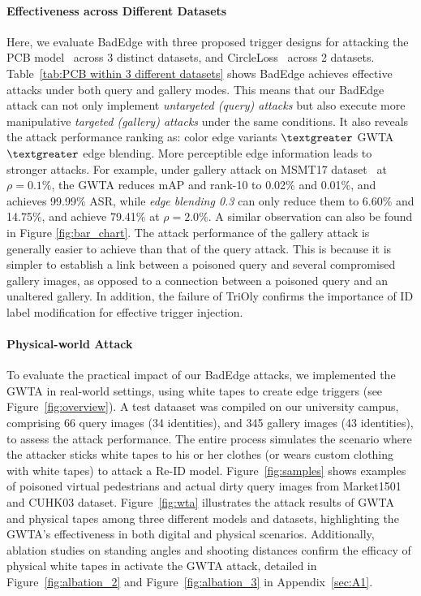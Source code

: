 \documentclass[sigconf,authordraft]{acmart}
\begin{document}
\paragraph{Effectiveness across Different Datasets} 
Here, we evaluate BadEdge with three proposed trigger designs for attacking the PCB model~\cite{sun2018beyond} across 3 distinct datasets, and CircleLoss~\cite{sun2020circle} across 2 datasets. Table~\ref{tab:PCB within 3 different datasets} shows BadEdge achieves effective attacks under both query and gallery modes. This means that our BadEdge attack can not only implement \emph{untargeted (query) attacks} but also execute more manipulative \emph{targeted (gallery) attacks} under the same conditions. It also reveals the attack performance ranking as: color edge variants $\textgreater$ GWTA $\textgreater$ edge blending. More perceptible edge information leads to stronger attacks. For example, under gallery attack on MSMT17 dataset~\cite{wei2018person} at $\rho = 0.1\%$, the GWTA reduces mAP and rank-10 to 0.02$\%$ and 0.01$\%$, and achieves 99.99$\%$ ASR, while \emph{edge blending 0.3} can only reduce them to 6.60$\%$ and 14.75$\%$, and achieve 79.41$\%$ at $\rho = 2.0\%$. A similar observation can also be found in Figure \ref{fig:bar_chart}. The attack performance of the gallery attack is generally easier to achieve than that of the query attack. This is because it is simpler to establish a link between a poisoned query and several compromised gallery images, as opposed to a connection between a poisoned query and an unaltered gallery. In addition, the failure of TriOly confirms the importance of ID label modification for effective trigger injection.

\paragraph{Physical-world Attack}
To evaluate the practical impact of our BadEdge attacks, we implemented the GWTA in real-world settings, using white tapes to create edge triggers (see Figure~\ref{fig:overview}). A test dataaset was compiled on our university campus, comprising 66 query images (34 identities), and 345 gallery images (43 identities), to assess the attack performance. The entire process simulates the scenario where the attacker sticks white tapes to his or her clothes (or wears custom clothing with white tapes) to attack a Re-ID model. Figure~\ref{fig:samples} shows examples of poisoned virtual pedestrians and actual dirty query images from Market1501 and CUHK03 dataset. Figure~\ref{fig:wta} illustrates the attack results of GWTA and physical tapes among three different models and datasets, highlighting the GWTA's effectiveness in both digital and physical scenarios. Additionally, ablation studies on standing angles and shooting distances confirm the efficacy of physical white tapes in activate the GWTA attack, detailed in Figure~\ref{fig:albation_2} and Figure~\ref{fig:albation_3} in Appendix~\ref{sec:A1}.
\end{document}
